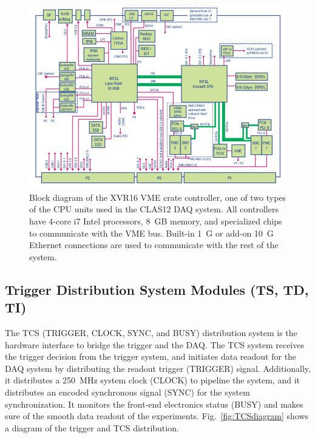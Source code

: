 \begin{figure}[hbt]
	\centering
	\includegraphics[width=1.0\columnwidth,keepaspectratio]{img/XVR16_diagram.png}
	\caption{Block diagram of the XVR16 VME crate controller, one of two types of the CPU units used in the CLAS12 DAQ system. All controllers have 4-core i7 Intel processors, 8~GB memory, and specialized chips to communicate with the VME bus. Built-in 1~G or add-on 10~G Ethernet connections are used to communicate with the rest of the system.}
	\label{fig:XVR16diagram}
\end{figure}



\subsection{Trigger Distribution System Modules (TS, TD, TI)}
	
The TCS (TRIGGER, CLOCK, SYNC, and BUSY) distribution system \cite{tcs-ref} is the hardware interface to bridge the trigger and the DAQ.  The TCS system receives the trigger decision from the trigger system, and initiates data readout for the DAQ system by distributing the readout trigger (TRIGGER) signal.  Additionally, it distributes a 250~MHz system clock (CLOCK) to pipeline the system, and it distributes an encoded synchronous signal (SYNC) for the system synchronization.  It monitors the front-end electronics status (BUSY) and makes sure of the smooth data readout of the experiments. Fig.~\ref{fig:TCSdiagram} shows a diagram of the trigger and TCS distribution.

